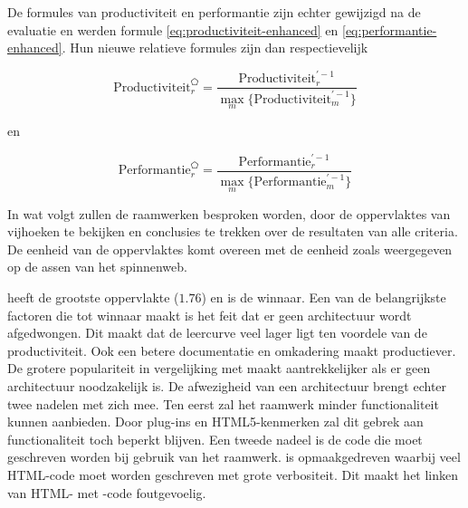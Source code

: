 De formules van productiviteit en performantie zijn echter gewijzigd na de evaluatie en werden formule \ref{eq:productiviteit-enhanced} en \ref{eq:performantie-enhanced}.
Hun nieuwe relatieve formules zijn dan respectievelijk

\begin{equation}
  \text{Productiviteit}_r^{\pentagon} = \frac{\text{Productiviteit}_r^{'-1}}{\underset{m}{\max}\{\text{Productiviteit}_m^{'-1}\}}
  \label{eq:rel-productiviteit-2}
\end{equation}

en

\begin{equation}
  \text{Performantie}_r^{\pentagon}= \frac{\text{Performantie}_r^{'-1}}{\underset{m}{\max}\{\text{Performantie}_m^{'-1}\}}
  \label{eq:rel-performantie-2}
\end{equation}



In wat volgt zullen de raamwerken besproken worden, door de oppervlaktes van vijhoeken te bekijken en conclusies te trekken over de resultaten van alle criteria.
De eenheid van de oppervlaktes komt overeen met de eenheid zoals weergegeven op de assen van het spinnenweb.


\jqm{} heeft de grootste oppervlakte ($1.76$) en is de winnaar.
Een van de belangrijkste factoren die \jqm{} tot winnaar maakt is het feit dat er geen architectuur wordt afgedwongen.
Dit maakt dat de leercurve veel lager ligt ten voordele van de productiviteit.
Ook een betere documentatie en omkadering maakt \jqm{} productiever.
De grotere populariteit in vergelijking met \lungo{} maakt \jqm{} aantrekkelijker als er geen architectuur noodzakelijk is.
De afwezigheid van een architectuur brengt echter twee nadelen met zich mee.
Ten eerst zal het raamwerk minder functionaliteit kunnen aanbieden.
Door plug-ins en HTML5-kenmerken zal dit gebrek aan functionaliteit toch beperkt blijven.
Een tweede nadeel is de code die moet geschreven worden bij gebruik van het \jqm{} raamwerk.
\jqm{} is opmaakgedreven waarbij veel HTML-code moet worden geschreven met grote verbositeit.
Dit maakt het linken van HTML- met \js{}-code foutgevoelig.

